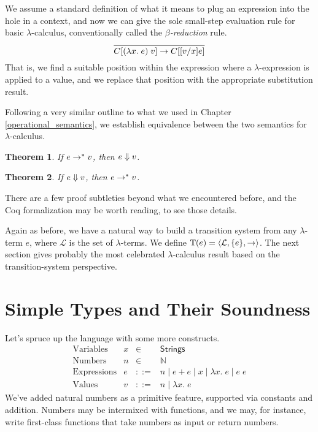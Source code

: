 \documentclass{amsbook}
\newtheorem{theorem}{Theorem}[chapter]
\theoremstyle{definition}
\theoremstyle{remark}
\numberwithin{section}{chapter}
\numberwithin{equation}{chapter}
\begin{document}
We assume a standard definition of what it means to plug an expression into the hole in a context, and now we can give the sole small-step evaluation rule for basic $\lambda$-calculus, conventionally called the \emph{$\beta$-reduction} rule.
\encoding
$$\infer{\smallstep{\plug{C}{(\lambda x. \; e) \; v}}{\plug{C}{\subst{e}{x}{v}}}}{}$$
That is, we find a suitable position within the expression where a $\lambda$-expression is applied to a value, and we replace that position with the appropriate substitution result.

Following a very similar outline to what we used in Chapter \ref{operational_semantics}, we establish equivalence between the two semantics for $\lambda$-calculus.

\begin{theorem}
  If $e \to^* v$, then $e \Downarrow v$.
\end{theorem}

\begin{theorem}
  If $e \Downarrow v$, then $e \to^* v$.
\end{theorem}

There are a few proof subtleties beyond what we encountered before, and the Coq formalization may be worth reading, to see those details.

Again as before, we have a natural way to build a transition system from any $\lambda$-term $e$, where $\mathcal L$ is the set of $\lambda$-terms.
We define $\mathbb T(e) = {\left \langle \mathcal L, \{e\}, \to \right \rangle}$.
The next section gives probably the most celebrated $\lambda$-calculus result based on the transition-system perspective.


\section{Simple Types and Their Soundness}

Let's spruce up the language with some more constructs.
$$\begin{array}{rrcl}
  \textrm{Variables} & x &\in& \mathsf{Strings} \\
  \textrm{Numbers} & n &\in& \mathbb N \\
  \textrm{Expressions} & e &::=& n \mid e + e \mid x \mid \lambda x. \; e \mid e \; e \\
  \textrm{Values} & v &::=& n \mid \lambda x. \; e
\end{array}$$
We've added natural numbers as a primitive feature, supported via constants and addition.
Numbers may be intermixed with functions, and we may, for instance, write first-class functions that take numbers as input or return numbers.
\end{document}
